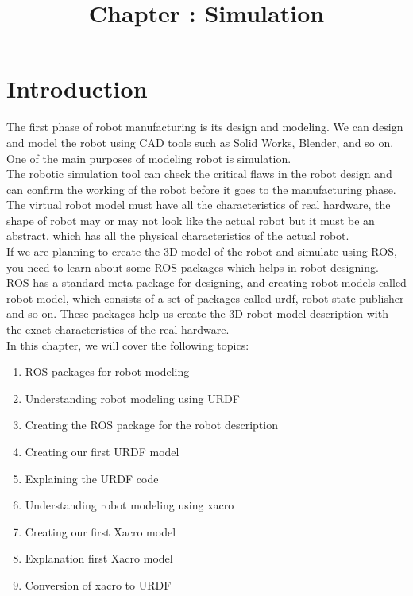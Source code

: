 \documentclass[a4paper]{article}
\title{Chapter :     Simulation}
\begin{document}
\maketitle

\section{Introduction}
The first phase of robot manufacturing is its design and modeling. We can design and model the 
robot using CAD tools such as Solid Works, Blender, and so on. One of the main purposes 
of modeling robot is simulation.
\\The robotic simulation tool can check the critical flaws in the robot design and can confirm the 
working of the robot before it goes to the manufacturing phase.
\\The virtual robot model must have all the characteristics of real hardware, the shape of robot 
may or may not look like the actual robot but it must be an abstract, which has all the physical 
characteristics of the actual robot.
\\If we are planning to create the 3D model of the robot and simulate using ROS, you need to learn 
about some ROS packages which helps in robot designing.
\\ ROS has a standard meta package for designing, and creating robot models called robot model, 
which consists of a set of packages called urdf, robot state publisher and so on. 
These packages help us create the 3D robot model description with the exact characteristics of the 
real hardware.
\\ In this chapter, we will cover the following topics:
\begin{enumerate}
\item ROS packages for robot modeling

\item    Understanding robot modeling using URDF

\item    Creating the ROS package for the robot description

\item    Creating our first URDF model

\item    Explaining the URDF code
\item   Understanding robot modeling using xacro

\item     Creating our first Xacro model

\item    Explanation first Xacro model

\item  Conversion of xacro to URDF
\end{enumerate}
\end{document}
